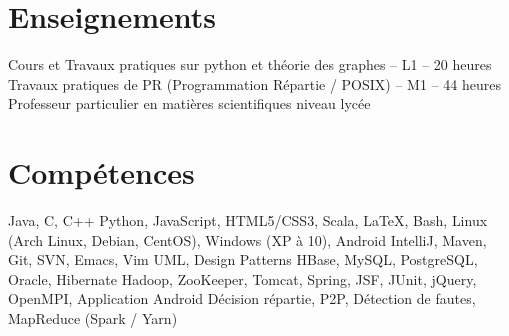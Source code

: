 \documentclass[11pt,a4paper,sans]{moderncv}
\begin{document}
\vspace{2em}


\section{Enseignements}
\vspace{1em}

       {Cours et Travaux pratiques sur python et théorie des graphes -- L1 -- 20 heures}
       {Travaux pratiques de PR (Programmation Répartie / POSIX) -- M1 -- 44 heures}
       {Professeur particulier en matières scientifiques niveau lycée}

\vspace{0.5em}


\section{Compétences}
\vspace{1em}

       {
            Java,
            C,
            C++
       }
       {
            Python,
            JavaScript,
            HTML5/CSS3,
            Scala,
            LaTeX,
            Bash,
       }
       {
            Linux (Arch Linux, Debian, CentOS),
            Windows (XP à 10),
            Android
       }
       {
            IntelliJ,
            Maven,
            Git,
            SVN,
            Emacs,
            Vim
       }
       {
            UML,
            Design Patterns
       }
       {
            HBase,
            MySQL,
            PostgreSQL,
            Oracle,
            Hibernate
       }
       {
            Hadoop,
            ZooKeeper,
            Tomcat,
            Spring,
            JSF,
            JUnit,
            jQuery,
            OpenMPI,
            Application Android
       }
       {
            Décision répartie,
            P2P,
            Détection de fautes,
            MapReduce (Spark / Yarn)
       }


\vspace{0.5em}
\end{document}
